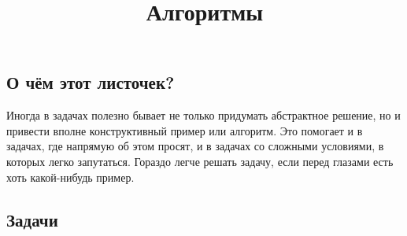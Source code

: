 \documentclass[a4paper,12pt]{article}
\title{Алгоритмы}
\date{}
\begin{document}
\maketitle
    \subsection*{О чём этот листочек?}
    Иногда в задачах полезно бывает не только придумать абстрактное решение, но и привести вполне конструктивный пример или алгоритм. Это помогает и в задачах, где напрямую об этом просят, и в задачах со сложными условиями, в которых легко запутаться. Гораздо легче решать задачу, если перед глазами есть хоть какой-нибудь пример.
    \subsection*{Задачи}
\end{document}
